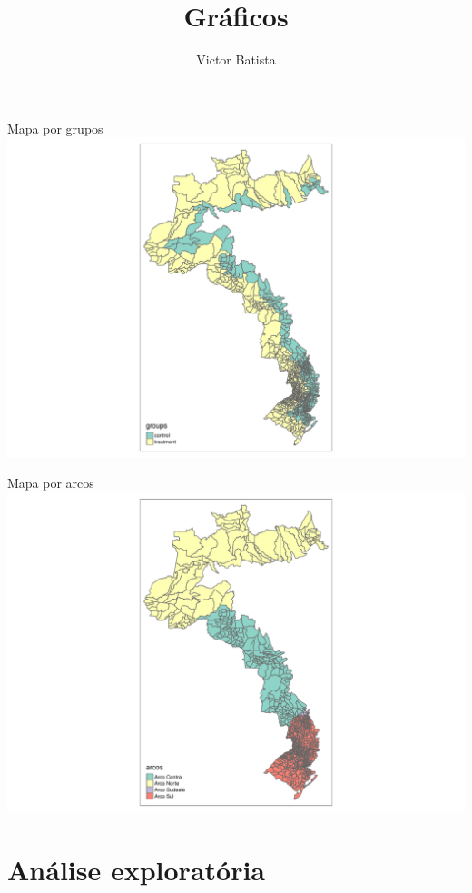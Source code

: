 \documentclass[
  ignorenonframetext,
]{beamer}
\title{Gráficos}
\author{Victor Batista}
\date{}
\begin{document}
\frame{\titlepage}


\begin{frame}{Mapa por grupos}
\label{mapa-por-grupos}
\includegraphics{graficos_files/figure-beamer/unnamed-chunk-4-1.pdf}
\end{frame}

\begin{frame}{Mapa por arcos}
\label{mapa-por-arcos}
\includegraphics{graficos_files/figure-beamer/unnamed-chunk-5-1.pdf}
\end{frame}

\section{Análise exploratória}\label{anuxe1lise-exploratuxf3ria}
\end{document}
